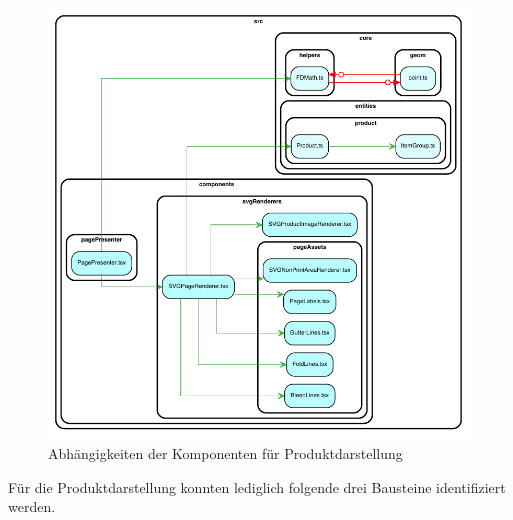 \begin{figure}[H]
    \centering
    \includegraphics{diagrams/Ist-Architektur/page-presenter-analysis.pdf}
    \caption{Abhängigkeiten der Komponenten für Produktdarstellung}
    \label{fig:Produktdarstellung}
\end{figure}

Für die Produktdarstellung konnten lediglich folgende drei Bausteine identifiziert werden.
\begin{multicols}{3}
    
\end{multicols}